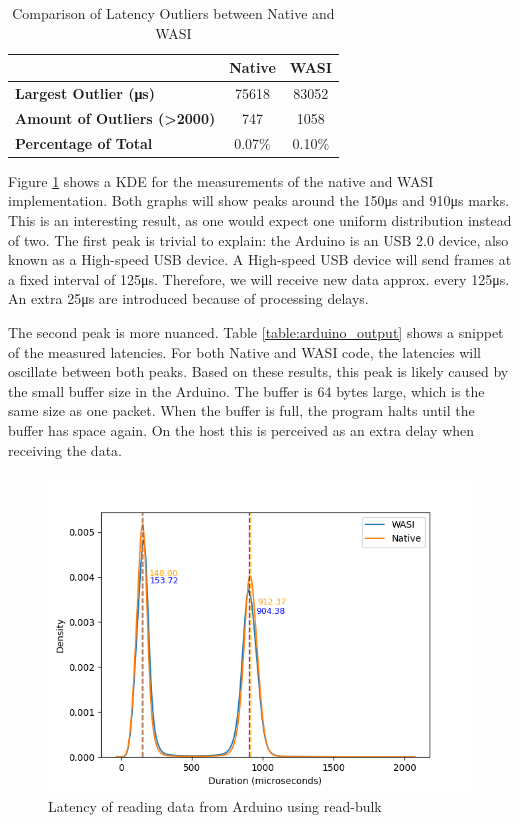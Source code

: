 \begin{table}[h]
\centering
\begin{tabular}{|l|c|c|}
\hline
 & \textbf{Native} & \textbf{WASI} \\ \hline
\textbf{Largest Outlier (μs)} & 75618 & 83052 \\ \hline
\textbf{Amount of Outliers (\textgreater 2000)} & 747 & 1058 \\ \hline
\textbf{Percentage of Total} & 0.07\% & 0.10\% \\ \hline
\end{tabular}
\caption{Comparison of Latency Outliers between Native and WASI}
\label{table:latency_comparison}
\end{table}



Figure \ref{fig:arduino_reading_latency} shows a \acrfull{KDE} for the measurements of the native and \acrshort{WASI} implementation.
Both graphs will show peaks around the 150μs and 910μs marks. This is an interesting result, as one would expect one uniform distribution instead of two. The first peak is trivial to explain: the Arduino is an USB 2.0 device, also known as a High-speed USB device. A High-speed USB device will send frames at a fixed interval of 125μs. Therefore, we will receive new data approx. every 125μs. An extra 25μs are introduced because of processing delays. 

The second peak is more nuanced. Table \ref{table:arduino_output} shows a snippet of the measured latencies. For both Native and WASI code, the latencies will oscillate between both peaks. Based on these results, this peak is likely caused by the small buffer size in the Arduino. The buffer is 64 bytes large, which is the same size as one packet. When the buffer is full, the program halts until the buffer has space again. On the host this is perceived as an extra delay when receiving the data.

\begin{figure}[H]
  \centering
  \includegraphics[width=1\textwidth]{images/reading_data_latency.png}
  \caption{Latency of reading data from Arduino using read-bulk}
  \label{fig:arduino_reading_latency}
\end{figure}

